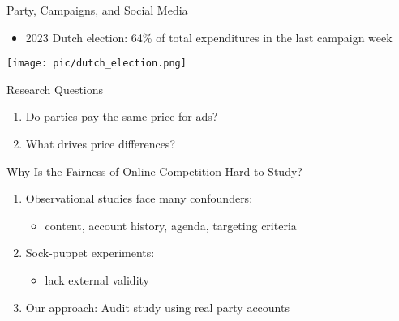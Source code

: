 \documentclass[
  ignorenonframetext,
]{beamer}
\providecommand{\tightlist}{%
  \setlength{\itemsep}{0pt}\setlength{\parskip}{0pt}}
\begin{document}
\begin{frame}{Party, Campaigns, and Social Media}
\label{party-campaigns-and-social-media-1}
\begin{itemize}
\tightlist
\item
  2023 Dutch election: 64\% of total expenditures in the last campaign
  week \vspace{.5cm}
\end{itemize}

\texttt{[image: pic/dutch\_election.png]}
\end{frame}

\begin{frame}{Research Questions}
\label{research-questions}
\begin{enumerate}
\tightlist
\item
  Do parties pay the same price for ads?
\end{enumerate}

\vspace{.5cm}
\pause

\begin{enumerate}
\setcounter{enumi}{1}
\tightlist
\item
  What drives price differences?
\end{enumerate}
\end{frame}

\begin{frame}{Why Is the Fairness of Online Competition Hard to Study?}
\label{why-is-the-fairness-of-online-competition-hard-to-study}
\begin{enumerate}
  \item Observational studies face many confounders:
    \begin{itemize}
      \item content, account history, agenda, targeting criteria
    \end{itemize}
  \vspace{.2cm}
  \pause

  \item Sock-puppet experiments:
    \begin{itemize}
      \item lack external validity
    \end{itemize}
  \vspace{.2cm}
  \pause

  \item Our approach: Audit study using real party accounts
\end{enumerate}
\end{frame}
\end{document}
